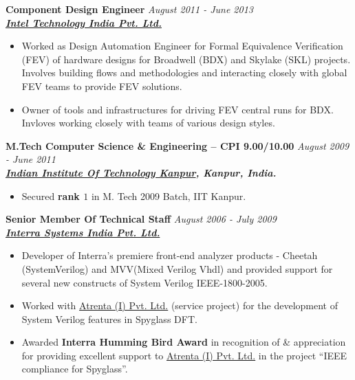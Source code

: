 \documentclass[9pt]{article}
\newenvironment{changemargin}[2]{%
  \begin{list}{}{%
    \setlength{\topsep}{0pt}%
    \setlength{\leftmargin}{#1}%
    \setlength{\rightmargin}{#2}%
    \setlength{\listparindent}{\parindent}%
    \setlength{\itemindent}{\parindent}%
    \setlength{\parsep}{\parskip}%
  }%
  \item[]}{\end{list}
}
\newenvironment{body} {
	\vspace*{-16pt}
	\begin{changemargin}{-0.25in}{-0.5in}
  }	
	{\end{changemargin}
}
\begin{document}
\begin{body}
 \medskip
        \textbf{Component Design Engineer} \hfill \emph{August 2011 - June 2013}\\
	\textbf{\emph{\href{http://www.intel.in/content/www/in/en/homepage.html}{Intel Technology India Pvt. Ltd.}}}
	\begin{itemize} \itemsep -0pt
                \item Worked as Design Automation Engineer for Formal Equivalence Verification (FEV) of hardware designs for Broadwell (BDX) and Skylake (SKL) projects. Involves
                building flows and methodologies and interacting closely with
                global FEV teams to provide FEV solutions.
                \item Owner of tools and infrastructures for driving
                FEV central runs for  BDX. Invloves working closely with teams of various
                design styles.
	\end{itemize} 

 \medskip
	\textbf{M.Tech Computer Science \& Engineering -- CPI 9.00/10.00}{} \hfill \emph{August 2009 - June 2011}{} \\
	\textbf{\emph{\href{http://www.iitk.ac.in/}{Indian Institute Of Technology Kanpur}, Kanpur, India.}{}} \\
	\begin{itemize} \itemsep -0pt
		\item Secured \textbf{rank $1$} in M. Tech 2009 Batch, IIT Kanpur.
	\end{itemize}

 \medskip
        \textbf{Senior Member Of Technical Staff} \hfill \emph{August 2006 - July 2009}\\
       	\textbf{\emph{\href{http://www.interrasystems.com/}{Interra Systems India Pvt. Ltd.}}}
	\begin{itemize} \itemsep -0pt
		\item Developer of Interra's premiere front-end analyzer products - Cheetah (SystemVerilog) and MVV(Mixed Verilog Vhdl) and 
		provided support for several new constructs of System Verilog IEEE-1800-2005. 
		\item Worked with \href{http://www.atrenta.com/}{Atrenta (I) Pvt. Ltd.} (service project) for the development of System Verilog features in Spyglass DFT.
		\item Awarded \textbf{Interra Humming Bird Award} in recognition of \& appreciation for providing excellent support to \href{}{Atrenta (I) Pvt. Ltd.} in the project ``IEEE compliance for Spyglass''.
	\end{itemize}


\end{body}
\end{document}
